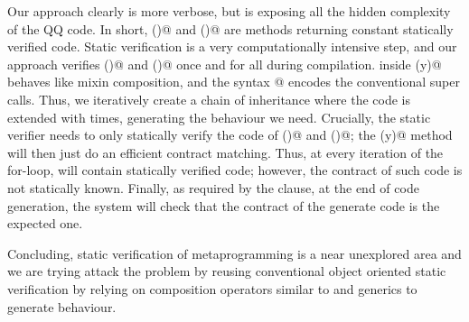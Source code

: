 \documentclass[a4paper,twoside,british,9pt]{extarticle}
\begin{document}
\vspace{-2ex}
Our approach clearly is more verbose, but is exposing all the hidden complexity
of the QQ code.
In short, \Q@base()@ and \Q@inductive()@ 
are methods returning constant statically verified code. Static verification is a very computationally intensive step, and our approach verifies
\Q@base()@ and \Q@inductive()@ once and for all during compilation.
\Q@Override@ inside \Q@generate(y)@ behaves like mixin composition,
and the syntax @ encodes the
conventional super calls.
Thus, we iteratively create a chain of inheritance where
the \Q@base@ code is extended with \Q@inductive@ \Q@y@
times, generating the behaviour we need.
Crucially, the static verifier needs to only statically verify the
code of \Q@base()@ and \Q@inductive()@;
the \Q@generate(y)@ method will then just do
an efficient contract matching.
Thus, at every iteration of the for-loop, \Q@res@
will contain statically verified code; however, the contract of such code is not statically known.
Finally, as required by the \Q@ensuresRV@ clause, at the end of code generation, the system will
check that the contract of the generate code is the expected one.

Concluding, static verification of metaprogramming is a
near unexplored area and we are trying attack the problem by reusing conventional
object oriented static verification by
relying on
composition operators similar to \Q@extends@ and generics to
generate behaviour.
\vspace{-3ex}

{\tiny }
\end{document}
